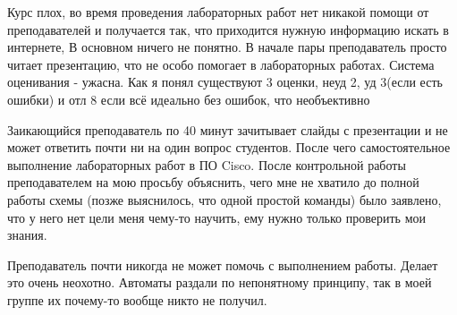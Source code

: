             \begin{commentbox} 
                Курс плох, во время проведения лабораторных работ нет никакой помощи от преподавателей и получается так, что приходится нужную информацию искать в интернете, В основном ничего не понятно. В начале пары преподаватель просто читает презентацию, что не особо помогает в лабораторных работах. Система оценивания - ужасна. Как я понял существуют 3 оценки, неуд 2, уд 3(если есть ошибки) и отл 8 если всё идеально без ошибок, что необъективно 
            \end{commentbox} 
        
            \begin{commentbox} 
                Заикающийся преподаватель по 40 минут зачитывает слайды с презентации и не может ответить почти ни на один вопрос студентов. После чего самостоятельное выполнение лабораторных работ в ПО Cisco. После контрольной работы преподавателем на мою просьбу объяснить, чего мне не хватило до полной работы схемы (позже выяснилось, что одной простой команды) было заявлено, что у него нет цели меня чему-то научить, ему нужно только проверить мои знания. 
            \end{commentbox} 
        
            \begin{commentbox} 
                Преподаватель почти никогда не может помочь с выполнением работы. Делает это очень неохотно. Автоматы раздали по непонятному принципу, так в моей группе их почему-то вообще никто не получил.  
            \end{commentbox} 
        

